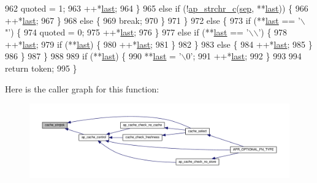 \begin{DoxyCode}
962                 quoted = 1;
963                 ++*\hyperlink{group__apr__strings_ga882d08c2e3ad3004cdfc219601ebaac8}{last};
964             \}
965             \textcolor{keywordflow}{else} \textcolor{keywordflow}{if} (!\hyperlink{group__APACHE__CORE__DAEMON_ga6016b58857e4c0b11e39913bdf4ff910}{ap\_strchr\_c}(\hyperlink{group__apr__strings_ga0234c8660bac5d4b5e016b1e715aed77}{sep}, **\hyperlink{group__apr__strings_ga882d08c2e3ad3004cdfc219601ebaac8}{last})) \{
966                 ++*\hyperlink{group__apr__strings_ga882d08c2e3ad3004cdfc219601ebaac8}{last};
967             \}
968             \textcolor{keywordflow}{else} \{
969                 \textcolor{keywordflow}{break};
970             \}
971         \}
972         \textcolor{keywordflow}{else} \{
973             \textcolor{keywordflow}{if} (**\hyperlink{group__apr__strings_ga882d08c2e3ad3004cdfc219601ebaac8}{last} == \textcolor{charliteral}{'\(\backslash\)"'}) \{
974                 quoted = 0;
975                 ++*\hyperlink{group__apr__strings_ga882d08c2e3ad3004cdfc219601ebaac8}{last};
976             \}
977             \textcolor{keywordflow}{else} \textcolor{keywordflow}{if} (**\hyperlink{group__apr__strings_ga882d08c2e3ad3004cdfc219601ebaac8}{last} == \textcolor{charliteral}{'\(\backslash\)\(\backslash\)'}) \{
978                 ++*\hyperlink{group__apr__strings_ga882d08c2e3ad3004cdfc219601ebaac8}{last};
979                 \textcolor{keywordflow}{if} (**\hyperlink{group__apr__strings_ga882d08c2e3ad3004cdfc219601ebaac8}{last}) \{
980                     ++*\hyperlink{group__apr__strings_ga882d08c2e3ad3004cdfc219601ebaac8}{last};
981                 \}
982             \}
983             \textcolor{keywordflow}{else} \{
984                 ++*\hyperlink{group__apr__strings_ga882d08c2e3ad3004cdfc219601ebaac8}{last};
985             \}
986         \}
987     \}
988 
989     \textcolor{keywordflow}{if} (**\hyperlink{group__apr__strings_ga882d08c2e3ad3004cdfc219601ebaac8}{last}) \{
990         **\hyperlink{group__apr__strings_ga882d08c2e3ad3004cdfc219601ebaac8}{last} = \textcolor{charliteral}{'\(\backslash\)0'};
991         ++*\hyperlink{group__apr__strings_ga882d08c2e3ad3004cdfc219601ebaac8}{last};
992     \}
993 
994     \textcolor{keywordflow}{return} token;
995 \}
\end{DoxyCode}


Here is the caller graph for this function\+:
\nopagebreak
\begin{figure}[H]
\begin{center}
\leavevmode
\includegraphics[width=350pt]{group__Cache__util_gada03570414af2b2d9349449858036d90_icgraph}
\end{center}
\end{figure}


